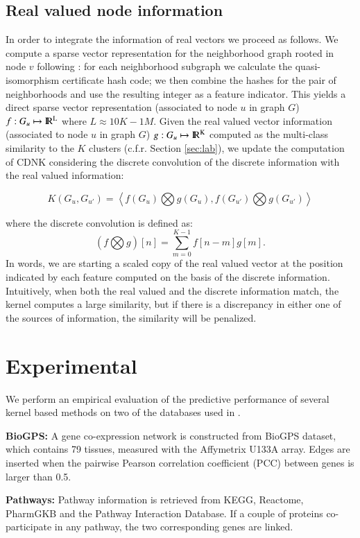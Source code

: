 \documentclass[review]{elsarticle}
\newcommand{\IR}{\rm I\!R}
\begin{document}
\subsection{Real valued node information}
In order to integrate the information of real vectors we proceed as follows. We compute a sparse vector representation for the neighborhood graph rooted in node $v$ following \cite{costa2010fast}: for each neighborhood subgraph we calculate the quasi-isomorphism certificate hash code; we then combine the hashes for the pair of neighborhoods and use the resulting integer as a feature indicator. This yields a direct sparse vector representation (associated to node $u$ in graph $G$) $f: G_u \mapsto \IR^L$ where $L \approx 10K-1M$. Given the real valued vector information (associated to node $u$ in graph $G$) $g: G_u \mapsto \IR^K$ computed as the multi-class similarity to the $K$ clusters (c.f.r. Section \ref{sec:lab}), we update the computation of CDNK considering the discrete convolution of the discrete information with the real valued information:   

$$K(G_u,G_{u'}) = \left< f(G_u) \bigotimes g(G_u), f(G_{u'}) \bigotimes g(G_{u'}) \right>$$

where the discrete convolution is defined as: 
$$(f \bigotimes g)[n]=\sum _{m=0}^{K-1}f[n-m]g[m].$$
In words, we are starting a scaled copy of the real valued vector at the position indicated by each feature computed on the basis of the discrete information. Intuitively, when both the real valued and the discrete information match, the kernel computes a large similarity, but if there is a discrepancy in either one of the sources of information, the similarity will be penalized. 


\section{Experimental}
We perform an empirical evaluation of the predictive performance of several kernel based methods on two of the databases used in \cite{chen2014disease}.

\textbf{BioGPS:} A gene co-expression network is constructed from BioGPS dataset, which contains 79 tissues, measured with the Affymetrix U133A array. Edges are inserted when the pairwise Pearson correlation coefficient (PCC) between genes is larger than 0.5.

\textbf{Pathways:} Pathway information is retrieved from KEGG, Reactome, PharmGKB and the Pathway Interaction Database. If a couple of proteins co-participate in any pathway, the two corresponding genes are linked.  
\end{document}
